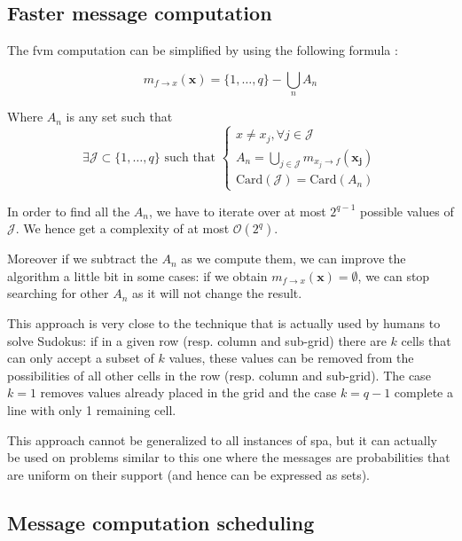 \documentclass[a4paper,11pt]{report}
\newcommand{\bigO}[1]{\mathcal O\left( #1 \right)}
\newcommand{\set}[1]{\{#1\}}
\begin{document}
\subsection{Faster message computation}
\label{sec:set}

The \ac{fvm} computation can be simplified by using the following formula \cite{atkins2014density}:

\begin{equation}
m_{f \to x} (\mathbf{x}) = \set{1,\dots,q} - \bigcup\limits_{n} A_n
\end{equation}

Where $A_n$ is any set such that
\begin{equation}
\exists \mathcal{J} \subset \set{1,\dots,q} \text{ such that }
\begin{cases}
x \ne x_j, \forall j \in \mathcal{J}\\
A_n = \bigcup\limits_{j \in \mathcal{J}} m_{x_j \to f} (\mathbf{x_j})\\
\mathrm{Card}(\mathcal{J}) = \mathrm{Card}(A_n)
\end{cases}
\end{equation}

In order to find all the $A_n$, we have to iterate over at most $2^{q-1}$ possible values of $\mathcal{J}$. We hence get a complexity of at most $\bigO{2^q}$.

Moreover if we subtract the $A_n$ as we compute them, we can improve the algorithm a little bit in some cases: if we obtain $m_{f \to x}(\mathbf{x}) = \emptyset$, we can stop searching for other $A_n$ as it will not change the result.

This approach is very close to the technique that is actually used by humans to solve Sudokus: if in a given row (resp. column and sub-grid) there are $k$ cells that can only accept a subset of $k$ values, these values can be removed from the possibilities of all other cells in the row (resp. column and sub-grid). The case $k=1$ removes values already placed in the grid and the case $k=q-1$ complete a line with only 1 remaining cell.

This approach cannot be generalized to all instances of \ac{spa}, but it can actually be used on problems similar to this one where the messages are probabilities that are uniform on their support (and hence can be expressed as sets).

\subsection{Message computation scheduling}
\label{sec:sched}
\end{document}
